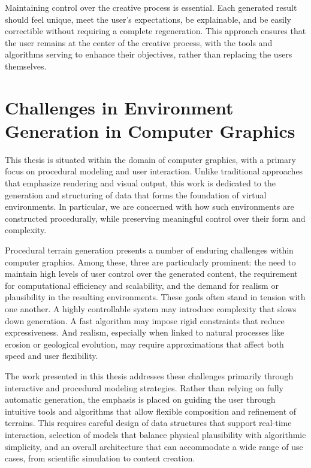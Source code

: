 Maintaining control over the creative process is essential. Each generated result should feel unique, meet the user's expectations, be explainable, and be easily correctible without requiring a complete regeneration. This approach ensures that the user remains at the center of the creative process, with the tools and algorithms serving to enhance their objectives, rather than replacing the users themselves.


\section{Challenges in Environment Generation in Computer Graphics}

This thesis is situated within the domain of computer graphics, with a primary focus on procedural modeling and user interaction. Unlike traditional approaches that emphasize rendering and visual output, this work is dedicated to the generation and structuring of data that forms the foundation of virtual environments. In particular, we are concerned with how such environments are constructed procedurally, while preserving meaningful control over their form and complexity.

Procedural terrain generation presents a number of enduring challenges within computer graphics. Among these, three are particularly prominent: the need to maintain high levels of user control over the generated content, the requirement for computational efficiency and scalability, and the demand for realism or plausibility in the resulting environments. These goals often stand in tension with one another. A highly controllable system may introduce complexity that slows down generation. A fast algorithm may impose rigid constraints that reduce expressiveness. And realism, especially when linked to natural processes like erosion or geological evolution, may require approximations that affect both speed and user flexibility.

The work presented in this thesis addresses these challenges primarily through interactive and procedural modeling strategies. Rather than relying on fully automatic generation, the emphasis is placed on guiding the user through intuitive tools and algorithms that allow flexible composition and refinement of terrains. This requires careful design of data structures that support real-time interaction, selection of models that balance physical plausibility with algorithmic simplicity, and an overall architecture that can accommodate a wide range of use cases, from scientific simulation to content creation.

